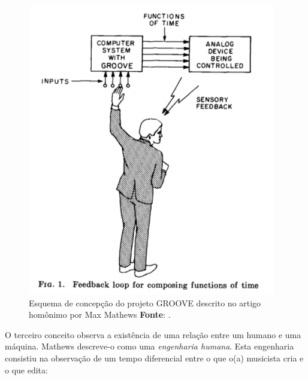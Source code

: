 \begin{figure}
\begin{center}
\includegraphics[scale=0.5]{./imagens/GROOVE.png}
\caption{Esquema de concepção do projeto GROOVE descrito no artigo homônimo por Max Mathews \textbf{Fonte}: \cite{mathews_groove_1970}.}
\label{fig:groove_sistema}
\end{center}
\end{figure} 

O terceiro conceito observa a existência de uma relação entre um humano e uma máquina. Mathews descreve-o como uma \emph{engenharia humana}. Esta engenharia consistiu na observação de um tempo diferencial entre o que o(a) musicista cria e o que edita:

